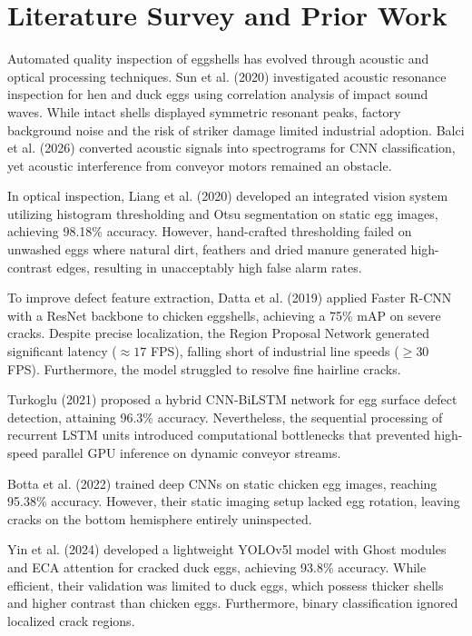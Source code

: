 \documentclass[12pt,a4paper]{report}
\begin{document}
\section{Literature Survey and Prior Work}

Automated quality inspection of eggshells has evolved through acoustic and optical processing techniques. Sun et al. (2020) investigated acoustic resonance inspection for hen and duck eggs using correlation analysis of impact sound waves. While intact shells displayed symmetric resonant peaks, factory background noise and the risk of striker damage limited industrial adoption. Balci et al. (2026) converted acoustic signals into spectrograms for CNN classification, yet acoustic interference from conveyor motors remained an obstacle.

In optical inspection, Liang et al. (2020) developed an integrated vision system utilizing histogram thresholding and Otsu segmentation on static egg images, achieving 98.18\% accuracy. However, hand-crafted thresholding failed on unwashed eggs where natural dirt, feathers and dried manure generated high-contrast edges, resulting in unacceptably high false alarm rates.

To improve defect feature extraction, Datta et al. (2019) applied Faster R-CNN with a ResNet backbone to chicken eggshells, achieving a 75\% mAP on severe cracks. Despite precise localization, the Region Proposal Network generated significant latency ($\approx 17$ FPS), falling short of industrial line speeds ($\ge 30$ FPS). Furthermore, the model struggled to resolve fine hairline cracks.

Turkoglu (2021) proposed a hybrid CNN-BiLSTM network for egg surface defect detection, attaining 96.3\% accuracy. Nevertheless, the sequential processing of recurrent LSTM units introduced computational bottlenecks that prevented high-speed parallel GPU inference on dynamic conveyor streams.

Botta et al. (2022) trained deep CNNs on static chicken egg images, reaching 95.38\% accuracy. However, their static imaging setup lacked egg rotation, leaving cracks on the bottom hemisphere entirely uninspected.

Yin et al. (2024) developed a lightweight YOLOv5l model with Ghost modules and ECA attention for cracked duck eggs, achieving 93.8\% accuracy. While efficient, their validation was limited to duck eggs, which possess thicker shells and higher contrast than chicken eggs. Furthermore, binary classification ignored localized crack regions.
\end{document}
